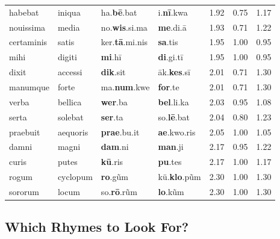 \documentclass[twocolumn, switch]{article} %
\begin{document}
\begin{table}[h!]
{\begin{tabular}{llllc@{\hspace{2\tabcolsep}}c@{\hspace{0.75\tabcolsep}}c}
       habebat &      iniqua &         ha.\textbf{bē}.bat &      i.\textbf{nī}.kwa &   1.92 &    0.75 &   1.17 \\
     nouissima &       media &       no.\textbf{wis}.si.ma &       \textbf{me}.di.ā &   1.93 &    0.71 &   1.22 \\
    certaminis &       satis &     ker.\textbf{tā}.mi.nis &         \textbf{sa}.tis &   1.95 &    1.00 &   0.95 \\
          mihi &      digiti &             \textbf{mi}.hī &      \textbf{di}.gi.tī &   1.95 &    1.00 &   0.95 \\
         dixit &     accessi &            \textbf{dik}.sit &    āk.\textbf{kes}.sī &   2.01 &    0.71 &   1.30 \\
      manumque &       forte &         ma.\textbf{num}.kwe &         \textbf{for}.te &   2.01 &    0.71 &   1.30 \\
         verba &     bellica &             \textbf{wer}.ba &      \textbf{bel}.li.ka &   2.03 &    0.95 &   1.08 \\
         serta &     solebat &             \textbf{ser}.ta &     so.\textbf{lē}.bat &   2.04 &    0.80 &   1.23 \\
      praebuit &    aequoris &         \textbf{prae}.bu.it &     \textbf{ae}.kwo.ris &   2.05 &    1.00 &   1.05 \\
         damni &       magni &             \textbf{dam}.ni &         \textbf{man}.ji &   2.17 &    0.95 &   1.22 \\
         curis &       putes &            \textbf{kū}.ris &         \textbf{pu}.tes &   2.17 &    1.00 &   1.17 \\
         rogum &    cyclopum &            \textbf{ro}.g\~{u}m &    kü.\textbf{klo}.p\~{u}m &   2.30 &    1.00 &   1.30 \\
       sororum &       locum &        so.\textbf{rō}.r\~{u}m &        \textbf{lo}.k\~{u}m &   2.30 &    1.00 &   1.30 \\
\bottomrule
\end{tabular}
}
\end{table}

\subsection{Which Rhymes to Look For?}
\label{sec:which_rhymes}
\end{document}
